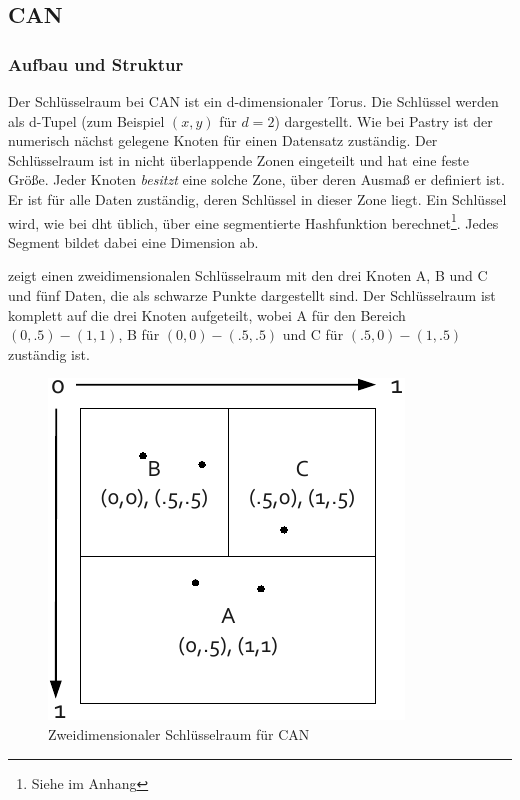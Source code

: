 \subsection{CAN}
\label{chap:evaluation_can}

\subsubsection{Aufbau und Struktur}
Der Schlüsselraum bei CAN \cite{Ratnasamy2001Scalable} ist ein d-dimensionaler Torus. Die Schlüssel werden als d-Tupel (zum Beispiel $(x,y)$ für $d=2$) dargestellt. Wie bei Pastry ist der numerisch nächst gelegene Knoten für einen Datensatz zuständig. Der Schlüsselraum ist in nicht überlappende Zonen eingeteilt und hat eine feste Größe. Jeder Knoten \emph{besitzt} eine solche Zone, über deren Ausmaß er definiert ist. Er ist für alle Daten zuständig, deren Schlüssel in dieser Zone liegt. Ein Schlüssel wird, wie bei \ac{dht} üblich, über eine segmentierte Hashfunktion berechnet\footnote{Siehe  im Anhang}. Jedes Segment bildet dabei eine Dimension ab.

 zeigt einen zweidimensionalen Schlüsselraum mit den drei Knoten A, B und C und fünf Daten, die als schwarze Punkte dargestellt sind. Der Schlüsselraum ist komplett auf die drei Knoten aufgeteilt, wobei A für den Bereich $(0, .5)-(1, 1)$, B für $(0, 0)-(.5, .5)$ und C für $(.5, 0)-(1, .5)$ zuständig ist.

\begin{figure}[htbp]
\centering
\includegraphics{grafics/can_key_space.pdf}
\caption{Zweidimensionaler Schlüsselraum für CAN}
\label{fig:can_key_space}
\end{figure}

